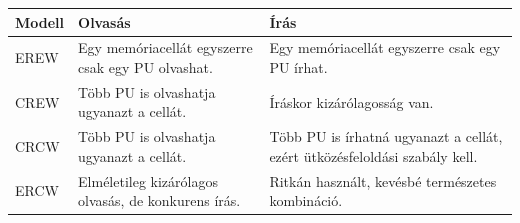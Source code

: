 
\begin{tabularx}{\textwidth}{L{25mm}X X}
\toprule
\textbf{Modell} & \textbf{Olvasás} & \textbf{Írás} \\
\midrule
EREW & Egy memóriacellát egyszerre csak egy PU olvashat. & Egy memóriacellát egyszerre csak egy PU írhat. \\
CREW & Több PU is olvashatja ugyanazt a cellát. & Íráskor kizárólagosság van. \\
CRCW & Több PU is olvashatja ugyanazt a cellát. & Több PU is írhatná ugyanazt a cellát, ezért ütközésfeloldási szabály kell. \\
ERCW & Elméletileg kizárólagos olvasás, de konkurens írás. & Ritkán használt, kevésbé természetes kombináció. \\
\bottomrule
\end{tabularx}
